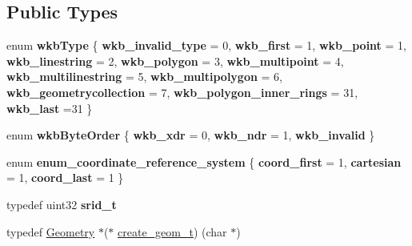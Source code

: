 \subsection*{Public Types}
\begin{DoxyCompactItemize}
\item 
\mbox{\label{classGeometry_a935fff34dbcb8870271cc4916e671c0d}} 
enum {\bfseries wkb\+Type} \{ \newline
{\bfseries wkb\+\_\+invalid\+\_\+type} = 0, 
{\bfseries wkb\+\_\+first} = 1, 
{\bfseries wkb\+\_\+point} = 1, 
{\bfseries wkb\+\_\+linestring} = 2, 
\newline
{\bfseries wkb\+\_\+polygon} = 3, 
{\bfseries wkb\+\_\+multipoint} = 4, 
{\bfseries wkb\+\_\+multilinestring} = 5, 
{\bfseries wkb\+\_\+multipolygon} = 6, 
\newline
{\bfseries wkb\+\_\+geometrycollection} = 7, 
{\bfseries wkb\+\_\+polygon\+\_\+inner\+\_\+rings} = 31, 
{\bfseries wkb\+\_\+last} =31
 \}
\item 
\mbox{\label{classGeometry_a3a4b1236a5f10d95e54d2c09a5e46dd5}} 
enum {\bfseries wkb\+Byte\+Order} \{ {\bfseries wkb\+\_\+xdr} = 0, 
{\bfseries wkb\+\_\+ndr} = 1, 
{\bfseries wkb\+\_\+invalid}
 \}
\item 
\mbox{\label{classGeometry_a1695bdad7d895e55a265eb842918142e}} 
enum {\bfseries enum\+\_\+coordinate\+\_\+reference\+\_\+system} \{ {\bfseries coord\+\_\+first} = 1, 
{\bfseries cartesian} = 1, 
{\bfseries coord\+\_\+last} = 1
 \}
\item 
\mbox{\label{classGeometry_a717fae78a9560c61c0cd16714d1e6858}} 
typedef uint32 {\bfseries srid\+\_\+t}
\item 
typedef \mbox{\hyperlink{classGeometry}{Geometry}} $\ast$($\ast$ \mbox{\hyperlink{classGeometry_a5f04b62bea15d6fccaaef20e29539610}{create\+\_\+geom\+\_\+t}}) (char $\ast$)
\end{DoxyCompactItemize}
